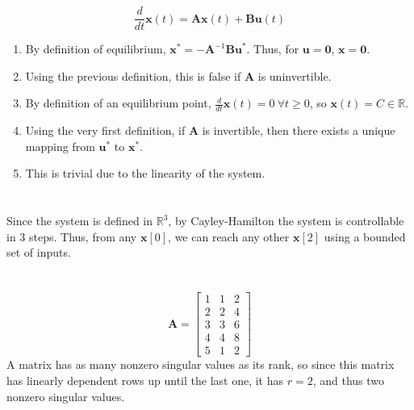 \documentclass[]{article}
\newcommand{\diff}[1]{\frac{d}{d #1}}
\begin{document}
\section{}

\begin{equation}
	\diff{t} \bm{x}(t) = \bm{Ax}(t) + \bm{Bu}(t)
\end{equation}

\begin{enumerate}
	\item By definition of equilibrium, \(\bm{x}^\ast = -\bm{A}^{-1}\bm{Bu}^\ast\). Thus, for \(\bm{u} = \bm{0}\), \(\bm{x} = \bm{0}\).
	\item Using the previous definition, this is false if \(\bm{A}\) is uninvertible.
	\item By definition of an equilibrium point, \(\diff{t}\bm{x}(t) = 0 \ \forall t \geqslant 0\), so \(\bm{x}(t) = C \in \mathbb{R}\).
	\item Using the very first definition, if \(\bm{A}\) is invertible, then there exists a unique mapping from \(\bm{u}^\ast\) to \(\bm{x}^\ast\).
	\item This is trivial due to the linearity of the system.
\end{enumerate}

\section{}

Since the system is defined in \(\mathbb{R}^3\), by Cayley-Hamilton the system is controllable in 3 steps.
Thus, from any \(\bm{x}[0]\), we can reach any other \(\bm{x}[2]\) using a bounded set of inputs.

\section{}

\begin{equation}
	\bm{A} =
	\begin{bmatrix}
	1 & 1 & 2 \\
	2 & 2 & 4 \\
	3 & 3 & 6 \\
	4 & 4 & 8 \\
	5 & 1 & 2
	\end{bmatrix}
\end{equation}
A matrix has as many nonzero singular values as its rank, so since this matrix has linearly dependent rows up until the last one, it has \(r = 2\), and thus two nonzero singular values.
\end{document}
